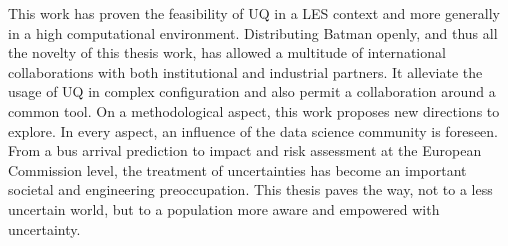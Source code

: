 This work has proven the feasibility of UQ in a LES context and more generally in a high computational environment. Distributing Batman openly, and thus all the novelty of this thesis work, has allowed a multitude of international collaborations with both institutional and industrial partners. It alleviate the usage of UQ in complex configuration and also permit a collaboration around a common tool. On a methodological aspect, this work proposes new directions to explore. In every aspect, an influence of the data science community is foreseen. From a bus arrival prediction to impact and risk assessment at the European Commission level, the treatment of uncertainties has become an important societal and engineering preoccupation. This thesis paves the way, not to a less uncertain world, but to a population more aware and empowered with uncertainty.








